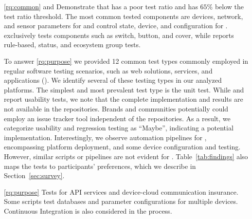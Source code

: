 \begin{boxK}
\ref{rq:common}   and  Demonstrate that \openhab has a poor test ratio and \homeassistant has $65\%$ \addons below the test ratio threshold. The most common tested components are devices, network, and sensor parameters for \openhab and control state, device, and configuration for \homeassistant. \homeassistant exclusively tests components such as switch, button, and cover, while \openhab reports rule-based, status, and ecosystem group tests.
\end{boxK}


To answer \ref{rq:purpose} we provided 12 common test types commonly employed in regular software testing scenarios, such as web solutions, services, and applications  (). We identify several of these testing types in our analyzed platforms. The simplest and most prevalent test type is the unit test. While \homeassistant and \openhab report usability tests, we note that the complete implementation and results are not available in the repositories. Brands and communities potentially could employ an issue tracker tool independent of the \github repositories. As a result, we categorize usability and regression testing as ``Maybe'', indicating a potential implementation. Interestingly, we observe automation pipelines for \homeassistant, encompassing platform deployment, and some device configuration and testing. However, similar scripts or pipelines are not evident for \openhab. Table~\ref{tab:findings} also maps the tests to participants' preferences, which we describe in Section~\ref{sec:survey}.




\begin{boxK}
\ref{rq:purpose} Tests for API services and device-cloud communication insurance. Some scripts test databases and parameter configurations for multiple devices. Continuous Integration is also considered in the process.
\end{boxK}




